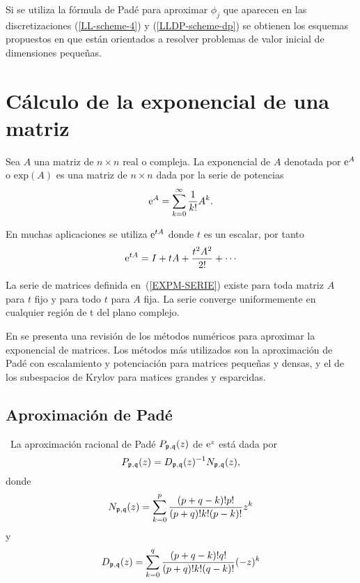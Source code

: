Si se utiliza la fórmula de Padé para aproximar $\phi_j$ que aparecen en las discretizaciones (\ref{LL-scheme-4}) y (\ref{LLDP-scheme-dp}) se obtienen los esquemas propuestos en \cite{Jimenez13,Jimenez14AMC} que están orientados a resolver problemas de valor inicial de dimensiones pequeñas. 

\section{Cálculo de la exponencial de una matriz}

\begin{definition}
    \label{EXPM}\cite{golub2013matrix} Sea $A$ una matriz de $n\times n$ real o compleja. La exponencial de $A$ denotada por
    $ \mathrm{e}^{A} $ o $\mathrm{exp}(A)$ es una matriz de $n\times n$ dada por la serie de potencias
    \[\mathrm{e}^{A}=\sum_{k=0}^{\infty}\frac{1}{k!}A^{k}.\]
\end{definition}
En muchas aplicaciones se utiliza $\mathrm{e}^{tA}$ donde $t$ es un escalar, por tanto 
\begin{equation}
\me{tA}=I+tA+\frac{t^{2}A^{2}}{2!}+\cdots\label{EXPM-SERIE}
\end{equation}
\begin{theorem}\cite{IntroMatrix}
    La serie de matrices definida en~(\ref{EXPM-SERIE}) existe para toda matriz $A$ para $t$ fijo y
    para todo $t$ para $A$ fija. La serie converge uniformemente en cualquier región de t del plano complejo.
\end{theorem}

En \cite{golub2013matrix} se presenta una revisión de los métodos numéricos
para aproximar
la exponencial de matrices. Los métodos más utilizados son la aproximación de Padé con escalamiento
y potenciación para matrices pequeñas y densas, y el de los subespacios de Krylov para matices grandes y esparcidas.


\subsection{Aproximación de Padé}\label{section:pade-approx}

\begin{definition}
    \cite{golub2013matrix}~La aproximación racional de Padé $P_{\mathfrak{p},\mathfrak{q}}(z)$
    de $\mathrm{e}^{z}$ está dada por 
    \begin{equation*}
    P_{\mathfrak{p},\mathfrak{q}}(z)=D_{\mathfrak{p},\mathfrak{q}}(z)^{-1}N_{\mathfrak{p},\mathfrak{q}}(z),  \label{FORM PADE}
    \end{equation*}%
    donde 
    \[
    N_{\mathfrak{p},\mathfrak{q}}(z)=\sum\limits_{k=0}^p\frac{(p+q-k)!p!}{(p+q)!k!(p-k)!}z^k
    \]%
    y 
    \[
    D_{\mathfrak{p},\mathfrak{q}}(z)=\sum\limits_{k=0}^q\frac{(p+q-k)!q!}{(p+q)!k!(q-k)!}(-z)^k
    \]
\end{definition}

